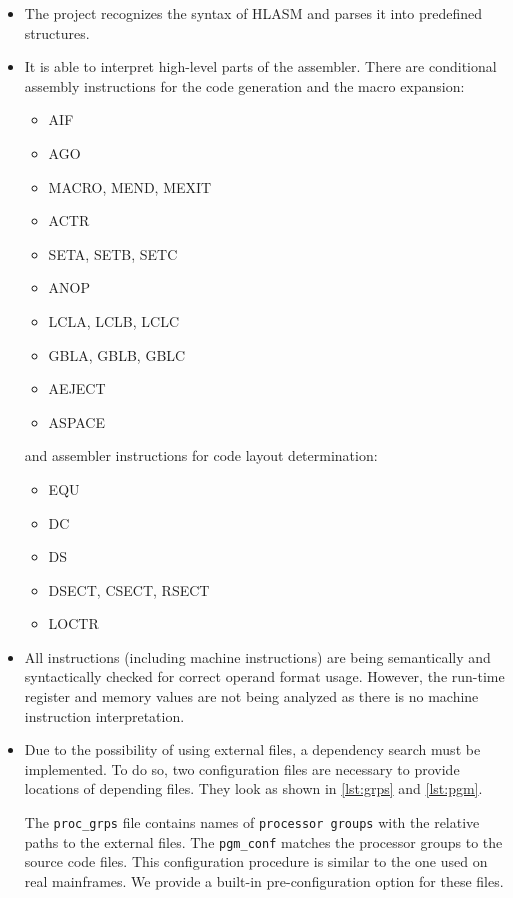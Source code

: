 \begin{itemize}
\item The project recognizes the syntax of HLASM and parses it into predefined structures. 

\item It is able to interpret high-level parts of the assembler. There are conditional assembly instructions for the code generation and the macro expansion:
\begin{itemize}
    \item AIF
    \item AGO
    \item MACRO, MEND, MEXIT
    \item ACTR
    \item SETA, SETB, SETC
    \item ANOP
    \item LCLA, LCLB, LCLC
    \item GBLA, GBLB, GBLC
    \item AEJECT
    \item ASPACE
\end{itemize}
and assembler instructions for code layout determination:
\begin{itemize}
    \item EQU 
    \item DC 
    \item DS 
    \item DSECT, CSECT, RSECT 
    \item LOCTR
\end{itemize}

\item All instructions (including machine instructions) are being semantically and syntactically checked for correct operand format usage. However, the run-time register and memory values are not being analyzed as there is no machine instruction interpretation.

\item Due to the possibility of using external files, a dependency search must be implemented. To do so, two configuration files are necessary to provide locations of depending files. They look as shown in \cref{lst:grps} and \cref{lst:pgm}. 

The \texttt{proc\_grps} file contains names of \texttt{processor groups} with the relative paths to the external files. The \texttt{pgm\_conf} matches the processor groups to the source code files. This configuration procedure is similar to the one used on real mainframes. We provide a built-in pre-configuration option for these files.


\end{itemize}
